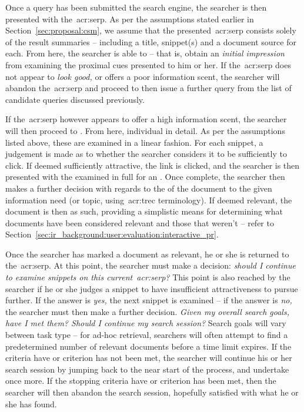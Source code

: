 Once a query has been submitted the search engine, the searcher is then presented with the~\gls{acr:serp}. As per the assumptions stated earlier in Section~\ref{sec:proposal:csm}, we assume that the presented~\gls{acr:serp} consists solely of the result summaries -- including a title, snippet(s) and a document source for each. From here, the searcher is able to  -- that is, obtain an \emph{initial impression} from examining the proximal cues presented to him or her. If the~\gls{acr:serp} does not appear to \emph{look good,} or offers a poor information scent, the searcher will abandon the~\gls{acr:serp} and proceed to then issue a further query from the list of candidate queries discussed previously.

If the~\gls{acr:serp} however appears to offer a high information scent, the searcher will then proceed to . From here, individual  in detail. As per the assumptions listed above, these are examined in a linear fashion. For each snippet, a judgement is made as to whether the searcher considers it to be sufficiently  to click. If deemed sufficiently attractive, the link is clicked, and the searcher is then presented with the  examined in full for an . Once complete, the searcher then makes a further decision with regards to the  of the document to the given information need (or topic, using~\gls{acr:trec} terminology). If deemed relevant, the document is then  as such, providing a simplistic means for determining what documents have been considered relevant and those that weren't -- refer to Section~\ref{sec:ir_background:user:evaluation:interactive_pr}.

Once the searcher has marked a document as relevant, he or she is returned to the~\gls{acr:serp}. At this point, the searcher must make a decision: \emph{should I continue to examine snippets on this current~\gls{acr:serp}?} This point is also reached by the searcher if he or she judges a snippet to have insufficient attractiveness to pursue further. If the answer is \emph{yes,} the next snippet is examined -- if the answer is \emph{no,} the searcher must then make a further decision. \emph{Given my overall search goals, have I met them? Should I continue my search session?} Search goals will vary between task type -- for ad-hoc retrieval, searchers will often attempt to find a predetermined number of relevant documents before a time limit expires. If the criteria have or criterion has not been met, the searcher will continue his or her search session by jumping back to the near start of the process, and undertake  once more. If the stopping criteria have or criterion has been met, then the searcher will then abandon the search session, hopefully satisfied with what he or she has found.

